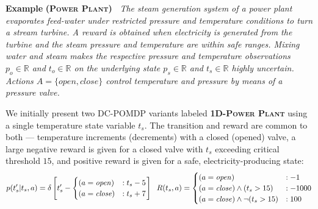 \documentclass{article} %
\newcommand{\open}{\mathit{open}}
\newcommand{\close}{\mathit{close}}
\begin{document}
\textbf{Example} \textsc{\bf (Power Plant)~\cite{steam2}} \emph{The steam
generation system of a power plant evaporates feed-water under restricted 
pressure and temperature conditions to turn a stream turbine.
A reward is obtained when electricity is generated from the turbine 
and the steam pressure and temperature are within safe ranges.
Mixing water and steam makes the
respective pressure and temperature observations $p_o \in \mathbb{R}$
and $t_o \in \mathbb{R}$ on the underlying state $p_s \in \mathbb{R}$
and $t_s \in \mathbb{R}$ highly uncertain.  Actions $A = \{ \open, \close \}$
control temperature and pressure by means of a pressure valve.}

We initially present two DC-POMDP variants labeled \textsc{\bf 1D-Power
  Plant} using a single temperature state variable $t_s$.  
The transition and reward are common to both ---
temperature increments (decrements) with a closed (opened) valve, a
large negative reward is given for a closed valve with $t_s$ exceeding
critical threshold $15$, and positive reward is given for a safe, 
electricity-producing state:
{\footnotesize
\vspace{-1mm}
\begin{align}
\label{eq:trans}
p(t_s'|t_s,a)= \delta\left[ t_s' - 
\begin{cases}
 (a=\open) &: t_s - 5 \\ 
(a = \close) &: t_s + 7 \\
\end{cases}
\right]
\hspace{2mm}
R(t_s,a) = 
\begin{cases}
 (a=\open) &: -1 \\
(a = \close)\wedge (t_s>15) &: -1000 \\
(a = \close)\wedge \neg(t_s>15) &: 100 \\
\end{cases} 
\end{align}
\vspace{-4mm}
}
\end{document}
